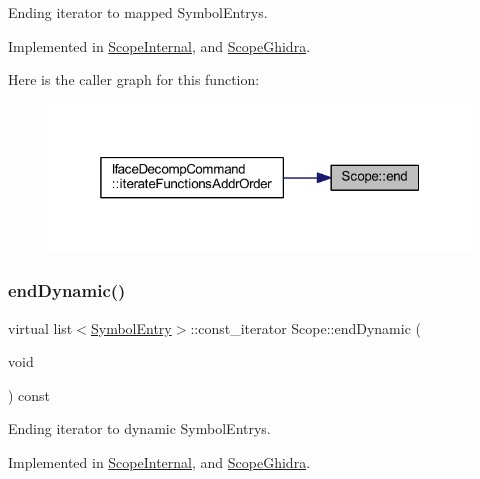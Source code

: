 Ending iterator to mapped Symbol\+Entrys. 



Implemented in \mbox{\hyperlink{class_scope_internal_a47df37673b1cea67ac1b4980037eafe0}{Scope\+Internal}}, and \mbox{\hyperlink{class_scope_ghidra_a7cf4b95214a2232a84e36ea5bfdd368c}{Scope\+Ghidra}}.

Here is the caller graph for this function\+:
\nopagebreak
\begin{figure}[H]
\begin{center}
\leavevmode
\includegraphics[width=319pt]{class_scope_a186b8c11ebef0f2d3838bfe1e46b6db6_icgraph}
\end{center}
\end{figure}
\mbox{\label{class_scope_add98c4a0c13d3497f82d0a5c2353b578}} 
\subsubsection{\texorpdfstring{endDynamic()}{endDynamic()}\hspace{0.1cm}{\footnotesize\ttfamily [1/2]}}
{\footnotesize\ttfamily virtual list$<$\mbox{\hyperlink{class_symbol_entry}{Symbol\+Entry}}$>$\+::const\+\_\+iterator Scope\+::end\+Dynamic (\begin{DoxyParamCaption}\item[{void}]{ }\end{DoxyParamCaption}) const\hspace{0.3cm}{\ttfamily [pure virtual]}}



Ending iterator to dynamic Symbol\+Entrys. 



Implemented in \mbox{\hyperlink{class_scope_internal_ad1690a1aacfecff51b6d5832cccafd95}{Scope\+Internal}}, and \mbox{\hyperlink{class_scope_ghidra_abbb53b6abc143a87ab2ad12337d9d571}{Scope\+Ghidra}}.

\mbox{\label{class_scope_a37c892157b9de825a3b475581fbf4019}} 
